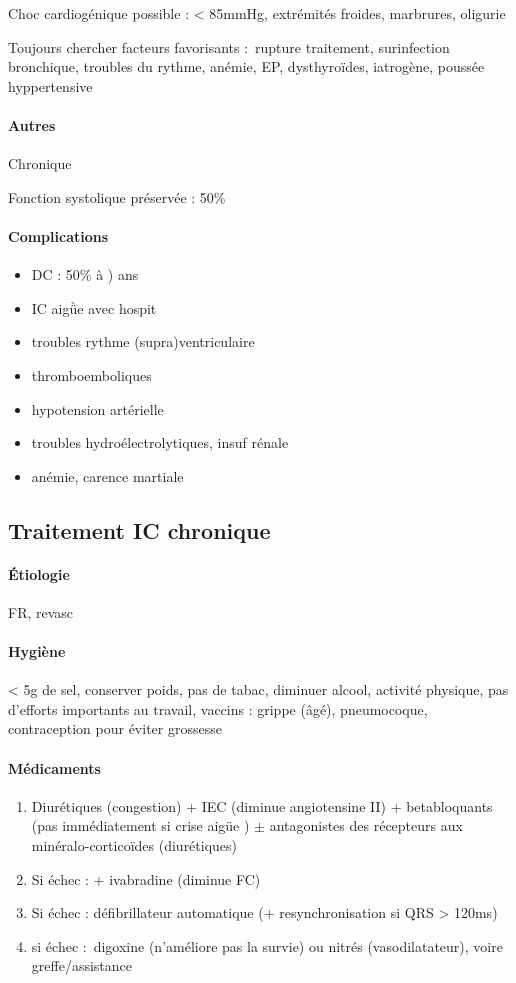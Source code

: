 Choc cardiogénique possible : < 85mmHg, extrémités froides, marbrures, oligurie

Toujours chercher facteurs favorisants : rupture traitement, surinfection
bronchique, troubles du rythme, anémie, EP, dysthyroïdes, iatrogène, poussée
hyppertensive

\paragraph{Autres}
Chronique

Fonction systolique préservée : 50\%

\paragraph{Complications}
\begin{itemize}
  \item DC : 50\% à ) ans
  \item IC aigǜe avec hospit
  \item troubles rythme (supra)ventriculaire
  \item thromboemboliques
  \item hypotension artérielle
  \item troubles hydroélectrolytiques, insuf rénale
  \item anémie, carence martiale
\end{itemize}

\subsection{Traitement IC chronique}
\paragraph{Étiologie}
FR, revasc

\paragraph{Hygiène}
< 5g de sel, conserver poids, pas de tabac, diminuer alcool, activité physique,
pas d'efforts importants au travail, vaccins : grippe (âgé), pneumocoque,
contraception pour éviter grossesse

\paragraph{Médicaments}
\begin{enumerate}
  \item Diurétiques (congestion) + IEC (diminue angiotensine II) + betabloquants
    (\skull pas immédiatement si crise aigüe \danger{}) $\pm$ antagonistes des
    récepteurs aux minéralo-corticoïdes (diurétiques)
  \item Si échec : + ivabradine (diminue FC)
  \item Si échec : défibrillateur automatique (+ resynchronisation si QRS >
    120ms)
  \item si échec : digoxine (n'améliore pas la survie) ou nitrés (vasodilatateur), voire greffe/assistance
\end{enumerate}

